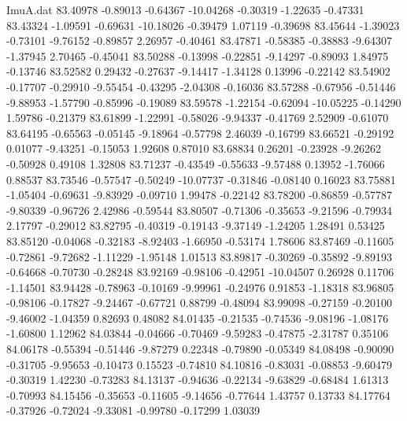 \begin{filecontents}{ImuA.dat}
  83.40978   -0.89013   -0.64367  -10.04268   -0.30319   -1.22635   -0.47331
  83.43324   -1.09591   -0.69631  -10.18026   -0.39479    1.07119   -0.39698
  83.45644   -1.39023   -0.73101   -9.76152   -0.89857    2.26957   -0.40461
  83.47871   -0.58385   -0.38883   -9.64307   -1.37945    2.70465   -0.45041
  83.50288   -0.13998   -0.22851   -9.14297   -0.89093    1.84975   -0.13746
  83.52582    0.29432   -0.27637   -9.14417   -1.34128    0.13996   -0.22142
  83.54902   -0.17707   -0.29910   -9.55454   -0.43295   -2.04308   -0.16036
  83.57288   -0.67956   -0.51446   -9.88953   -1.57790   -0.85996   -0.19089
  83.59578   -1.22154   -0.62094  -10.05225   -0.14290    1.59786   -0.21379
  83.61899   -1.22991   -0.58026   -9.94337   -0.41769    2.52909   -0.61070
  83.64195   -0.65563   -0.05145   -9.18964   -0.57798    2.46039   -0.16799
  83.66521   -0.29192    0.01077   -9.43251   -0.15053    1.92608    0.87010
  83.68834    0.26201   -0.23928   -9.26262   -0.50928    0.49108    1.32808
  83.71237   -0.43549   -0.55633   -9.57488    0.13952   -1.76066    0.88537
  83.73546   -0.57547   -0.50249  -10.07737   -0.31846   -0.08140    0.16023
  83.75881   -1.05404   -0.69631   -9.83929   -0.09710    1.99478   -0.22142
  83.78200   -0.86859   -0.57787   -9.80339   -0.96726    2.42986   -0.59544
  83.80507   -0.71306   -0.35653   -9.21596   -0.79934    2.17797   -0.29012
  83.82795   -0.40319   -0.19143   -9.37149   -1.24205    1.28491    0.53425
  83.85120   -0.04068   -0.32183   -8.92403   -1.66950   -0.53174    1.78606
  83.87469   -0.11605   -0.72861   -9.72682   -1.11229   -1.95148    1.01513
  83.89817   -0.30269   -0.35892   -9.89193   -0.64668   -0.70730   -0.28248
  83.92169   -0.98106   -0.42951  -10.04507    0.26928    0.11706   -1.14501
  83.94428   -0.78963   -0.10169   -9.99961   -0.24976    0.91853   -1.18318
  83.96805   -0.98106   -0.17827   -9.24467   -0.67721    0.88799   -0.48094
  83.99098   -0.27159   -0.20100   -9.46002   -1.04359    0.82693    0.48082
  84.01435   -0.21535   -0.74536   -9.08196   -1.08176   -1.60800    1.12962
  84.03844   -0.04666   -0.70469   -9.59283   -0.47875   -2.31787    0.35106
  84.06178   -0.55394   -0.51446   -9.87279    0.22348   -0.79890   -0.05349
  84.08498   -0.90090   -0.31705   -9.95653   -0.10473    0.15523   -0.74810
  84.10816   -0.83031   -0.08853   -9.60479   -0.30319    1.42230   -0.73283
  84.13137   -0.94636   -0.22134   -9.63829   -0.68484    1.61313   -0.70993
  84.15456   -0.35653   -0.11605   -9.14656   -0.77644    1.43757    0.13733
  84.17764   -0.37926   -0.72024   -9.33081   -0.99780   -0.17299    1.03039

\end{filecontents}
